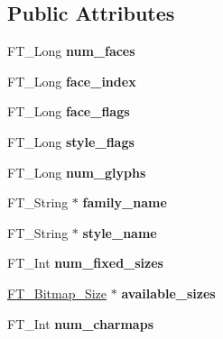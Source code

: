 \subsection*{Public Attributes}
\begin{DoxyCompactItemize}
\item 
\mbox{\label{structFT__FaceRec___af28be4cba102baaeb09d8e24b71e88fe}} 
F\+T\+\_\+\+Long {\bfseries num\+\_\+faces}
\item 
\mbox{\label{structFT__FaceRec___ab9a5640eb25bd3c743b3d725edd68a87}} 
F\+T\+\_\+\+Long {\bfseries face\+\_\+index}
\item 
\mbox{\label{structFT__FaceRec___af1596857ebc9f8eac4c4b51c8f3ffd31}} 
F\+T\+\_\+\+Long {\bfseries face\+\_\+flags}
\item 
\mbox{\label{structFT__FaceRec___ab06fc56f19fc1bf51cbed9bd621d3835}} 
F\+T\+\_\+\+Long {\bfseries style\+\_\+flags}
\item 
\mbox{\label{structFT__FaceRec___a58348bc3e0e113e8c73de9c318a9bd7a}} 
F\+T\+\_\+\+Long {\bfseries num\+\_\+glyphs}
\item 
\mbox{\label{structFT__FaceRec___a20c3adea8c17e4cbf47f24ef4160a89c}} 
F\+T\+\_\+\+String $\ast$ {\bfseries family\+\_\+name}
\item 
\mbox{\label{structFT__FaceRec___a2214ba9f5b98d35024d10c185c7db69f}} 
F\+T\+\_\+\+String $\ast$ {\bfseries style\+\_\+name}
\item 
\mbox{\label{structFT__FaceRec___aa652af958546eb8edf87ccd4b697bfdf}} 
F\+T\+\_\+\+Int {\bfseries num\+\_\+fixed\+\_\+sizes}
\item 
\mbox{\label{structFT__FaceRec___a360e348e51a4969abe18862f952c93b0}} 
\hyperlink{structFT__Bitmap__Size__}{F\+T\+\_\+\+Bitmap\+\_\+\+Size} $\ast$ {\bfseries available\+\_\+sizes}
\item 
\mbox{\label{structFT__FaceRec___a6b953f00e56d508611bb94af85b6d84b}} 
F\+T\+\_\+\+Int {\bfseries num\+\_\+charmaps}

\end{DoxyCompactItemize}
